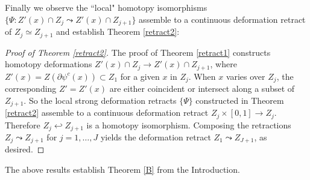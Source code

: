 \documentclass[12pt]{amsart}
\theoremstyle{definition}
\theoremstyle{remark}
\newcommand{\bR}{\mathbb{R}}
\newcommand{\del}{\partial}
\begin{document}
Finally we observe the ``local" homotopy isomorphisms $\{\Psi: Z'(x) \cap Z_j \leadsto Z'(x) \cap Z_{j+1}\}$ assemble to a continuous deformation retract of $Z_j \simeq Z_{j+1}$ and establish Theorem \ref{retract2}:

\begin{proof}[Proof of Theorem \ref{retract2}]
The proof of Theorem \ref{retract1} constructs homotopy deformations $Z'(x) \cap Z_j \to Z'(x) \cap Z_{j+1}$, where $Z'(x)=Z(\del \psi^c (x)) \subset Z_1$ for a given $x$ in $Z_j$. When $x$ varies over $Z_j$, the corresponding $Z'=Z'(x)$ are either coincident or intersect along a subset of $Z_{j+1}$. So the local strong deformation retracts $\{\Psi\}$ constructed in Theorem \ref{retract2} assemble to a continuous deformation retract $Z_j \times [0,1] \to Z_j$. Therefore $Z_j \hookleftarrow Z_{j+1}$ is a homotopy isomorphism. Composing the retractions $Z_j \leadsto Z_{j+1}$ for $j=1,\ldots, J$ yields the deformation retract $Z_1 \leadsto Z_{J+1}$, as desired. 
\end{proof}

The above results establish Theorem \ref{B} from the Introduction.











\end{document}
